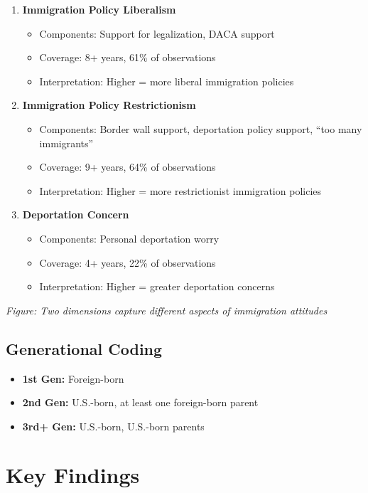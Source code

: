 \documentclass[11pt,letterpaper]{article}
\begin{document}
\begin{enumerate}
    \item \textbf{Immigration Policy Liberalism}
    \begin{itemize}
        \item Components: Support for legalization, DACA support
        \item Coverage: 8+ years, 61\% of observations
        \item Interpretation: Higher = more liberal immigration policies
    \end{itemize}
    
    \item \textbf{Immigration Policy Restrictionism}
    \begin{itemize}
        \item Components: Border wall support, deportation policy support, ``too many immigrants''
        \item Coverage: 9+ years, 64\% of observations
        \item Interpretation: Higher = more restrictionist immigration policies
    \end{itemize}
    
    \item \textbf{Deportation Concern}
    \begin{itemize}
        \item Components: Personal deportation worry
        \item Coverage: 4+ years, 22\% of observations
        \item Interpretation: Higher = greater deportation concerns
    \end{itemize}
\end{enumerate}

\textit{Figure: Two dimensions capture different aspects of immigration attitudes}

\subsection{Generational Coding}
\begin{itemize}
    \item \textbf{1st Gen:} Foreign-born
    \item \textbf{2nd Gen:} U.S.-born, at least one foreign-born parent
    \item \textbf{3rd+ Gen:} U.S.-born, U.S.-born parents
\end{itemize}

\section{Key Findings}
\end{document}
